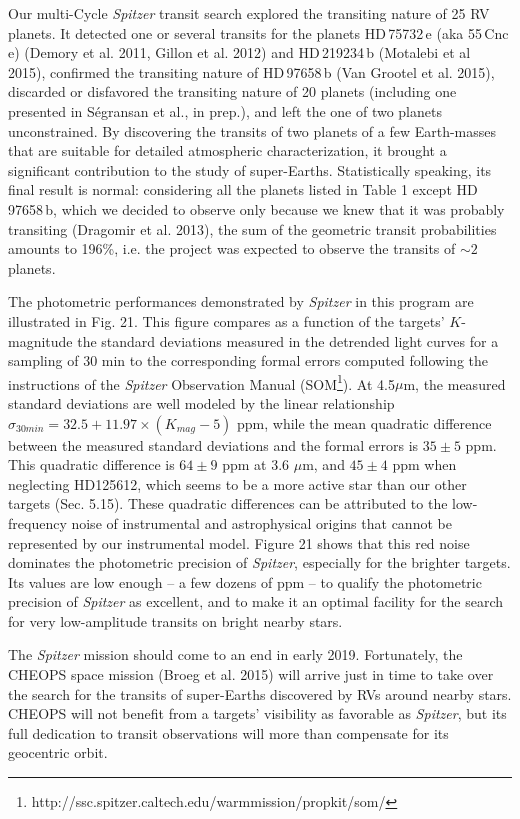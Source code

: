 \documentclass[traditabstract]{aa}
\begin{document}
Our multi-Cycle {\it Spitzer} transit search explored the transiting nature of 25 RV planets. It detected one or several transits for the planets HD\,75732\,e (aka 55\,Cnc\,e) (Demory et al. 2011, Gillon et al. 2012) and HD\,219234\,b (Motalebi et al 2015), confirmed the transiting nature of HD\,97658\,b (Van Grootel et al. 2015), discarded or disfavored the transiting nature of 20 planets (including one presented in S\'egransan et al., in prep.), and left the one of two planets unconstrained. By discovering the transits of two planets of a few Earth-masses  that are suitable for detailed atmospheric characterization, it brought a significant contribution to the study of super-Earths.  Statistically speaking, its final result is normal: considering  all the planets listed in Table 1 except HD\,97658\,b, which we decided to observe only because we knew that it was probably transiting (Dragomir et al. 2013),  the sum of the geometric transit probabilities amounts to 196\%, i.e. the project was expected to observe the transits of $\sim 2$ planets. 

 The photometric performances demonstrated by {\it Spitzer} in this program are illustrated in Fig. 21. This figure compares as a function of the targets' $K$-magnitude the standard deviations measured in the detrended light curves for a sampling of 30 min to the corresponding formal errors computed following the instructions of the {\it Spitzer} Observation Manual (SOM\footnote{http://ssc.spitzer.caltech.edu/warmmission/propkit/som/}). At 4.5$\mu$m, the measured standard deviations are well modeled by the linear relationship $\sigma_{30min} =  32.5 + 11.97\times(K_{mag} - 5)$ ppm, while the mean quadratic difference between the measured standard deviations and the formal errors is $35\pm5$ ppm. This quadratic difference is $64\pm9$ ppm at 3.6 $\mu$m, and $45\pm4$ ppm when neglecting HD125612, which seems to be a more active star than our other targets (Sec. 5.15).  These quadratic differences can be attributed to the low-frequency noise of instrumental and astrophysical origins that cannot be represented by our instrumental model. Figure 21 shows that this red noise dominates the photometric precision of {\it Spitzer}, especially for the brighter targets. Its values are low enough --  a few dozens of ppm -- to qualify the photometric precision of {\it Spitzer} as excellent, and to make it an optimal facility for the search for very low-amplitude transits on bright nearby stars. 

 The {\it Spitzer} mission should come to an end in early 2019. Fortunately, the CHEOPS space mission (Broeg et al. 2015)  will arrive just in time to  take over the search for the transits of super-Earths discovered by RVs around nearby stars. CHEOPS will not benefit from a targets' visibility as favorable as {\it Spitzer}, but its full dedication to transit observations  will more than compensate for its geocentric orbit. 
 
\end{document}
